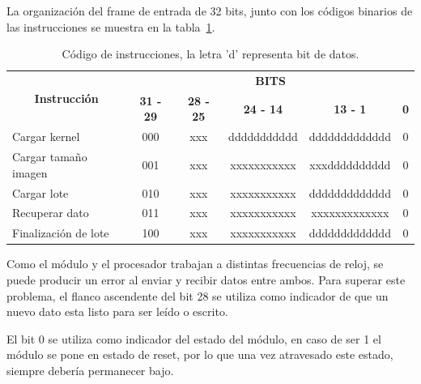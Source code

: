La organización del frame de entrada de 32 bits, junto con los códigos binarios
de las instrucciones se muestra en la tabla~\ref{instr}.

\begin{table}
\renewcommand{\arraystretch}{1.3}
\caption{Código de instrucciones, la letra 'd' representa bit de datos.}
\label{instr}
\centering
\begin{tabular}{|l|c|c|c|c|c|}
  \hline
  \multicolumn{1}{|c|}{\multirow{2}{*}{\textbf{Instrucción}}} & \multicolumn{5}{c|}{\textbf{BITS}} \\ \cline{2-6}
                                        & \textbf{31 - 29} & \textbf{28 - 25} & \textbf{24 - 14} & \textbf{13 - 1} & \textbf{0}\\\hline
  Cargar kernel                         & 000              & xxx              & ddddddddddd      & ddddddddddddd   & 0         \\\hline
  Cargar tamaño imagen                  & 001              & xxx              & xxxxxxxxxxx      & xxxdddddddddd   & 0         \\\hline
  Cargar lote                           & 010              & xxx              & xxxxxxxxxxx      & ddddddddddddd   & 0         \\\hline
  Recuperar dato                        & 011              & xxx              & xxxxxxxxxxx      & xxxxxxxxxxxxx   & 0         \\\hline
  Finalización de lote                  & 100              & xxx              & xxxxxxxxxxx      & ddddddddddddd   & 0         \\\hline
\end{tabular}           
\end{table}

Como el módulo y el procesador trabajan a distintas frecuencias de reloj, se
puede producir un error al enviar y recibir datos entre ambos. Para superar este
problema, el flanco ascendente del bit 28 se utiliza como indicador de que un
nuevo dato esta listo para ser leído o escrito. 

El bit 0 se utiliza como indicador del estado del módulo, en caso de ser 1 el
módulo se pone en estado de reset, por lo que una vez atravesado este estado,
siempre debería permanecer bajo.

